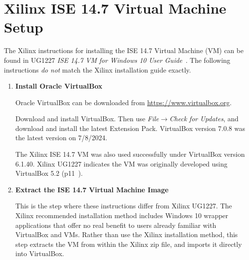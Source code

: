 \section{Xilinx ISE 14.7 Virtual Machine Setup}
%
The Xilinx instructions for installing the ISE 14.7 Virtual Machine (VM) can
be found in UG1227 \emph{ISE 14.7 VM for Windows 10 User Guide}~\cite{Xilinx_UG1227_2020}.
The following instructions \emph{do not} match the Xilinx installation guide
exactly.
%
\begin{enumerate}
\item \textbf{Install Oracle VirtualBox}

Oracle VirtualBox can be downloaded from
\href{https://www.virtualbox.org}{https://www.virtualbox.org}.

Download and install VirtualBox. Then use \emph{File$\rightarrow$Check for Updates},
and download and install the latest Extension Pack.
VirtualBox version 7.0.8 was the latest version on 7/8/2024. 

The Xilinx ISE 14.7 VM was also used successfully under VirtualBox version 6.1.40.
Xilinx UG1227 indicates the VM was originally developed using VirtualBox 5.2
(p11~\cite{Xilinx_UG1227_2020}).

\item \textbf{Extract the ISE 14.7 Virtual Machine Image}

This is the step where these instructions differ from Xilinx UG1227. The Xilinx
recommended installation method includes Windows 10 wrapper applications that 
offer no real benefit to users already familiar with VirtualBox and VMs. 
Rather than use the Xilinx installation method, this step extracts the VM from 
within the Xilinx zip file, and imports it directly into VirtualBox.


\end{enumerate}

